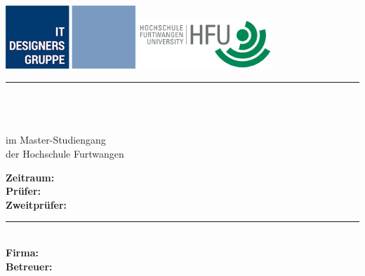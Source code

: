 
\newcommand{\HRule}[2]{\noindent\rule[#1]{\linewidth}{#2}} %
\newcommand{\vlinespace}[1]{\vspace*{#1\baselineskip}} %
\newcommand{\titleemph}[1]{\textbf{#1}} %

\begin{titlepage}
 \sffamily %
      \includegraphics[scale=0.7]{ressources/img/logo_itdesigners}
      \hfill
      \includegraphics[width=5cm]{ressources/img/logo_hfu}
      \HRule{13pt}{1pt}
      \centering
      \Large
      \vlinespace{1}\\
      \workTyp\\
      \vspace{1em}
      \huge
      \workTitel\\
%
      \Large
      \vlinespace{2}
          im Master-Studiengang \workStudiengang\\
          der Hochschule Furtwangen\\

      \vlinespace{2}
      \workNameStudent
%
   \vfill
   \raggedright
%
   \large
   \titleemph{Zeitraum:} \workSemester \\ %
   \titleemph{Prüfer:} \workPruefer \\
   \titleemph{Zweitprüfer:} \workBetreuer \\ %

   \vlinespace{1}
   \HRule{13pt}{1pt} \\
   \titleemph{Firma:} \workFirma \\
   \titleemph{Betreuer:} \workBetreuer
%
\end{titlepage}
